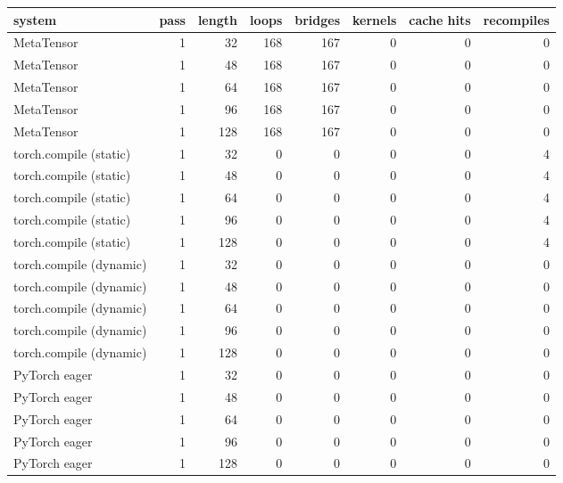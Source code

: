 \begin{tabular}{lrrrrrrr}
\toprule
system & pass & length & loops & bridges & kernels & cache hits & recompiles \\
\midrule
MetaTensor & 1 & 32 & 168 & 167 & 0 & 0 & 0 \\
MetaTensor & 1 & 48 & 168 & 167 & 0 & 0 & 0 \\
MetaTensor & 1 & 64 & 168 & 167 & 0 & 0 & 0 \\
MetaTensor & 1 & 96 & 168 & 167 & 0 & 0 & 0 \\
MetaTensor & 1 & 128 & 168 & 167 & 0 & 0 & 0 \\
torch.compile (static) & 1 & 32 & 0 & 0 & 0 & 0 & 4 \\
torch.compile (static) & 1 & 48 & 0 & 0 & 0 & 0 & 4 \\
torch.compile (static) & 1 & 64 & 0 & 0 & 0 & 0 & 4 \\
torch.compile (static) & 1 & 96 & 0 & 0 & 0 & 0 & 4 \\
torch.compile (static) & 1 & 128 & 0 & 0 & 0 & 0 & 4 \\
torch.compile (dynamic) & 1 & 32 & 0 & 0 & 0 & 0 & 0 \\
torch.compile (dynamic) & 1 & 48 & 0 & 0 & 0 & 0 & 0 \\
torch.compile (dynamic) & 1 & 64 & 0 & 0 & 0 & 0 & 0 \\
torch.compile (dynamic) & 1 & 96 & 0 & 0 & 0 & 0 & 0 \\
torch.compile (dynamic) & 1 & 128 & 0 & 0 & 0 & 0 & 0 \\
PyTorch eager & 1 & 32 & 0 & 0 & 0 & 0 & 0 \\
PyTorch eager & 1 & 48 & 0 & 0 & 0 & 0 & 0 \\
PyTorch eager & 1 & 64 & 0 & 0 & 0 & 0 & 0 \\
PyTorch eager & 1 & 96 & 0 & 0 & 0 & 0 & 0 \\
PyTorch eager & 1 & 128 & 0 & 0 & 0 & 0 & 0 \\
\bottomrule
\end{tabular}
